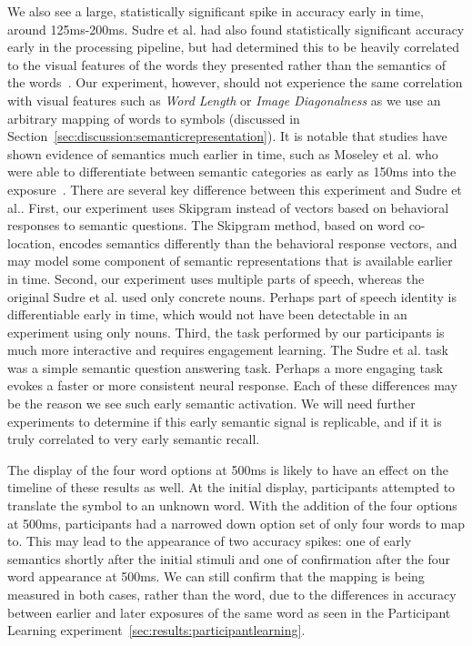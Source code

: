 We also see a large, statistically significant spike in \tvt accuracy early in 
time, around 125ms-200ms. Sudre et al. had also found statistically significant 
accuracy early in the processing pipeline, but had determined this to be 
heavily correlated to the visual features of the words they presented rather 
than the semantics of the words~\cite{Sudre2012}. Our experiment, however, 
should not experience the same correlation with visual features such as 
\emph{Word Length} or \emph{Image Diagonalness} as we use an arbitrary mapping 
of words to symbols (discussed in 
Section~\ref{sec:discussion:semanticrepresentation}). It is notable that 
studies have shown evidence of semantics much earlier in time, such as Moseley 
et al. who were able to differentiate between semantic categories as early as 
150ms into the exposure~\cite{moseley2013sensorimotor}. There are several key 
difference between this experiment and Sudre et al..  First, our experiment 
uses Skipgram instead of vectors based on behavioral responses to semantic 
questions. The Skipgram method, based on word co-location, encodes semantics 
differently than the behavioral response vectors, and may model some component 
of semantic representations that is available earlier in time.  Second, our 
experiment uses multiple parts of speech, whereas the original Sudre et al. 
used only concrete nouns.  Perhaps part of speech identity is differentiable 
early in time, which would not have been detectable in an experiment using only 
nouns.  Third, the task performed by our participants is much more interactive 
and requires engagement learning.  The Sudre et al. task was a simple semantic 
question answering task. Perhaps a more engaging task evokes a faster or more 
consistent neural response.  Each of these differences may be the reason we see 
such early semantic activation.  We will need further experiments to determine 
if this early semantic signal is replicable, and if it is truly correlated to 
very early semantic recall.

The display of the four word options at 500ms is likely to have an effect on 
the timeline of these results as well. At the initial display, participants 
attempted to translate the symbol to an unknown word. With the addition of the 
four options at 500ms, participants had a narrowed down option set of only four 
words to map to. This may lead to the appearance of two accuracy spikes: one of 
early semantics shortly after the initial stimuli and one of confirmation after 
the four word appearance at 500ms. We can still confirm that the mapping is 
being measured in both cases, rather than the word, due to the differences in 
\tvt accuracy between earlier and later exposures of the same word as seen in 
the Participant Learning experiment~\ref{sec:results:participantlearning}.
